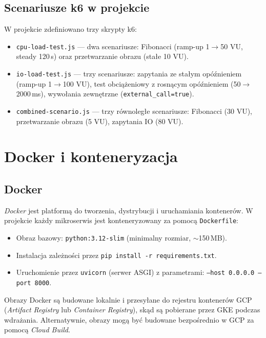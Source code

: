 \subsection{Scenariusze k6 w projekcie}

W projekcie zdefiniowano trzy skrypty k6:

\begin{itemize}
  \item \texttt{cpu-load-test.js} — dwa scenariusze: Fibonacci (ramp-up 1$\rightarrow$50 VU, steady 120\,s) oraz przetwarzanie obrazu (stałe 10 VU).
  \item \texttt{io-load-test.js} — trzy scenariusze: zapytania ze stałym opóźnieniem (ramp-up 1$\rightarrow$100 VU), test obciążeniowy z rosnącym opóźnieniem (50$\rightarrow$2000\,ms), wywołania zewnętrzne (\texttt{external\_call=true}).
  \item \texttt{combined-scenario.js} — trzy równoległe scenariusze: Fibonacci (30 VU), przetwarzanie obrazu (5 VU), zapytania IO (80 VU).
\end{itemize}

\section{Docker i konteneryzacja}

\subsection{Docker}

\textit{Docker} jest platformą do tworzenia, dystrybucji i uruchamiania kontenerów. W projekcie każdy mikroserwis jest konteneryzowany za pomocą \texttt{Dockerfile}:

\begin{itemize}
  \item Obraz bazowy: \texttt{python:3.12-slim} (minimalny rozmiar, $\sim$150\,MB).
  \item Instalacja zależności przez \texttt{pip install -r requirements.txt}.
  \item Uruchomienie przez \texttt{uvicorn} (serwer ASGI) z parametrami: \texttt{--host 0.0.0.0 --port 8000}.
\end{itemize}

Obrazy Docker są budowane lokalnie i przesyłane do rejestru kontenerów GCP (\textit{Artifact Registry} lub \textit{Container Registry}), skąd są pobierane przez GKE podczas wdrażania. Alternatywnie, obrazy mogą być budowane bezpośrednio w GCP za pomocą \textit{Cloud Build}.

